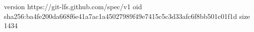 version https://git-lfs.github.com/spec/v1
oid sha256:ba4fe200da668f6e41a7ac1a45027989f49e7415c5c3d33afc6f8bb501c01f1d
size 1434
